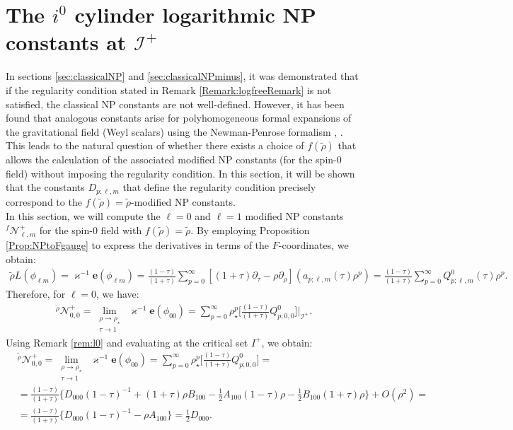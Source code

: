 \section{The $i^0$ cylinder logarithmic NP constants at $\mathscr{I}^{+}$}
\label{sec:LogarithmicNP_main}

In sections \ref{sec:classicalNP} and \ref{sec:classicalNPminus}, it was demonstrated that if the regularity condition stated in Remark \ref{Remark:logfreeRemark} is not satisfied, the classical NP constants are not well-defined. However, it has been found that analogous constants arise for polyhomogeneous formal expansions of the gravitational field (Weyl scalars) using the Newman-Penrose formalism \cite{Val98}, \cite{Val99a}. This leads to the natural question of whether there exists a choice of $f(\tilde{\rho})$ that allows the calculation of the associated modified NP constants (for the spin-0 field) without imposing the regularity condition. In this section, it will be shown that the constants $D_{p;\ell,m}$ that define the regularity condition precisely correspond to the $f(\tilde{\rho}) = \tilde{\rho}$-modified NP constants. \\
In this section, we will compute the $\ell=0$ and $\ell=1$ modified NP constants ${}^{f}\mathcal{N}^{+}_{\ell,m}$ for the spin-0 field with $f(\tilde{\rho})=\tilde{\rho}$. By employing Proposition \ref{Prop:NPtoFgauge} to express the derivatives in terms of the $F$-coordinates, we obtain:
\begin{align}
  \tilde{\rho}L (\phi_{\ell m})= \varkappa^{-1}\boldsymbol{e} (\phi_{\ell m}) = \frac{(1-\tau)}{(1+\tau)}\sum_{p=0}^{\infty}[(1+\tau)\partial_{\tau}-\rho\partial_{\rho}](a_{p;\ell,m}(\tau)\rho^p) = \frac{(1-\tau)}{(1+\tau)}\sum_{p=0}^{\infty}Q^{0}_{p;\ell,m}(\tau)\rho^p.
\end{align}
Therefore, for $\ell=0$, we have:
\begin{align}
  \mathcal{}^{\tilde{\rho}}\mathcal{N}^{+}_{0,0} = \lim_{\substack{\rho \to \rho_{\star} \\ \tau \to 1}} \; \varkappa^{-1}\boldsymbol{e}(\phi_{00}) = \sum_{p=0}^{\infty}\rho_{\star}^p\biggl[\frac{(1-\tau)}{(1+\tau)}Q^{0}_{p;0,0}\biggr]|_{\mathscr{I}^{+}}.
\end{align}
Using Remark \ref{rem:l0} and evaluating at the critical set $I^{+}$, we obtain:
\begin{align}
  & \mathcal{}^{\tilde{\rho}}\mathcal{N}^{+}_{0,0} = \lim_{\substack{\rho \to \rho_{\star} \\ \tau \to 1}} \; \varkappa^{-1}\boldsymbol{e}(\phi_{00}) = \sum_{p=0}^{\infty}\rho_{\star}^p\biggl[\frac{(1-\tau)}{(1+\tau)}Q^{0}_{p;0,0}\biggr] = \nonumber \\
  & = \frac{(1-\tau)}{(1+\tau)}\biggl\{D_{000}(1-\tau)^{-1} + (1+\tau)\rho B_{100}-\frac{1}{2}A_{100}(1-\tau)\rho - \frac{1}{2}B_{100}(1+\tau)\rho\biggr\} + O(\rho^{2}) =\nonumber \\
  & = \frac{(1-\tau)}{(1+\tau)}\biggl\{D_{000}(1-\tau)^{-1} - \rho A_{100}\biggr\} = \frac{1}{2}D_{000}.
\end{align}
